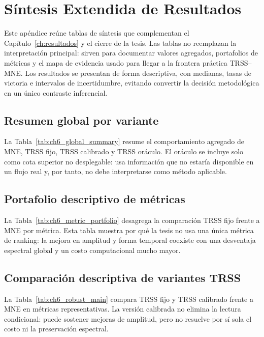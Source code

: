 \chapter{Síntesis Extendida de Resultados}
\label{ap:tablas_extensas}

Este apéndice reúne tablas de síntesis que complementan el Capítulo~\ref{ch:resultados} y el cierre de la tesis. Las tablas no reemplazan la interpretación principal: sirven para documentar valores agregados, portafolios de métricas y el mapa de evidencia usado para llegar a la frontera práctica TRSS--MNE. Los resultados se presentan de forma descriptiva, con medianas, tasas de victoria e intervalos de incertidumbre, evitando convertir la decisión metodológica en un único contraste inferencial.

\section{Resumen global por variante}

La Tabla~\ref{tab:ch6_global_summary} resume el comportamiento agregado de MNE, TRSS fijo, TRSS calibrado y TRSS oráculo. El oráculo se incluye solo como cota superior no desplegable: usa información que no estaría disponible en un flujo real y, por tanto, no debe interpretarse como método aplicable.



\section{Portafolio descriptivo de métricas}

La Tabla~\ref{tab:ch6_metric_portfolio} desagrega la comparación TRSS fijo frente a MNE por métrica. Esta tabla muestra por qué la tesis no usa una única métrica de ranking: la mejora en amplitud y forma temporal coexiste con una desventaja espectral global y un costo computacional mucho mayor.



\section{Comparación descriptiva de variantes TRSS}

La Tabla~\ref{tab:ch6_robust_main} compara TRSS fijo y TRSS calibrado frente a MNE en métricas representativas. La versión calibrada no elimina la lectura condicional: puede sostener mejoras de amplitud, pero no resuelve por sí sola el costo ni la preservación espectral.




